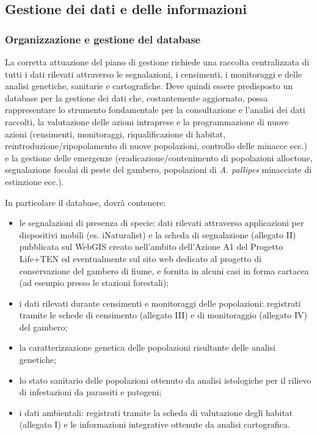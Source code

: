 \documentclass[11pt,a4paper,italian,twoside,openany]{memoir}
\begin{document}
\subsection{Gestione dei dati e delle informazioni}
\label{sub_dat}
\subsubsection{Organizzazione e gestione del database}
\label{subsub_dat}
La corretta attuazione del piano di gestione richiede una raccolta centralizzata di tutti i dati rilevati attraverso le segnalazioni, i censimenti, i monitoraggi e delle analisi genetiche, sanitarie e cartografiche. Deve quindi essere predisposto un database per la gestione dei dati che, costantemente aggiornato, possa rappresentare lo strumento fondamentale per la consultazione e l'analisi dei dati raccolti, la valutazione delle azioni intraprese e la programmazione di nuove azioni (censimenti, monitoraggi, riqualificazione di habitat, reintroduzione/ripopolamento di nuove popolazioni, controllo delle minacce ecc.) e la gestione delle emergenze (eradicazione/contenimento di popolazioni alloctone, segnalazione focolai di peste del gambero, popolazioni di \emph{A. pallipes} minacciate di estinzione ecc.). 

In particolare il database, dovrà contenere:
\begin{itemize}
  \item le segnalazioni di presenza di specie: dati rilevati attraverso applicazioni per dispositivi mobili (es. iNaturalist) e la scheda di segnalazione (allegato II) pubblicata sul WebGIS creato nell'ambito dell'Azione A1 del Progetto Life+TEN ed eventualmente sul sito web dedicato al progetto di conservazione del gambero di fiume, e fornita in alcuni casi in forma cartacea (ad esempio presso le stazioni forestali);
  \item i dati rilevati durante censimenti e monitoraggi delle popolazioni: registrati tramite le schede di censimento (allegato III) e di monitoraggio (allegato IV) del gambero;
  \item la caratterizzazione genetica delle popolazioni risultante delle analisi genetiche;
  \item lo stato sanitario delle popolazioni ottenuto da analisi istologiche per il rilievo di infestazioni da parassiti e patogeni;
  \item i dati ambientali: registrati tramite la scheda di valutazione degli habitat (allegato I) e le informazioni integrative ottenute da analisi cartografica.
\end{itemize}
\end{document}
